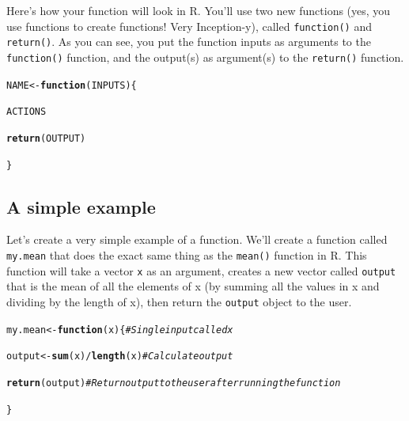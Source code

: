 \documentclass{tufte-book}\usepackage[]{graphicx}\usepackage[]{color}
\makeatletter
\newcommand{\hlcom}[1]{\textcolor[rgb]{0.678,0.584,0.686}{\textit{#1}}}%
\newcommand{\hlopt}[1]{\textcolor[rgb]{0,0,0}{#1}}%
\newcommand{\hlstd}[1]{\textcolor[rgb]{0.345,0.345,0.345}{#1}}%
\newcommand{\hlkwa}[1]{\textcolor[rgb]{0.161,0.373,0.58}{\textbf{#1}}}%
\newcommand{\hlkwb}[1]{\textcolor[rgb]{0.69,0.353,0.396}{#1}}%
\newcommand{\hlkwc}[1]{\textcolor[rgb]{0.333,0.667,0.333}{#1}}%
\newcommand{\hlkwd}[1]{\textcolor[rgb]{0.737,0.353,0.396}{\textbf{#1}}}%
\newenvironment{kframe}{%
 \def\at@end@of@kframe{}%
 \ifinner\ifhmode%
  \def\at@end@of@kframe{\end{minipage}}%
  \begin{minipage}{\columnwidth}%
 \fi\fi%
 \def\FrameCommand##1{\hskip\@totalleftmargin \hskip-\fboxsep
 \colorbox{shadecolor}{##1}\hskip-\fboxsep
     \hskip-\linewidth \hskip-\@totalleftmargin \hskip\columnwidth}%
 \MakeFramed {\advance\hsize-\width
   \@totalleftmargin\z@ \linewidth\hsize
   \@setminipage}}%
 {\par\unskip\endMakeFramed%
 \at@end@of@kframe}
\newenvironment{knitrout}{}{} %
\makeatother
\begin{document}
Here's how your function will look in R. You'll use two new functions (yes, you use functions to create functions! Very Inception-y), called \texttt{function()} and \texttt{return()}. As you can see, you put the function inputs as arguments to the \texttt{function()} function, and the output(s) as argument(s) to the \texttt{return()} function.

\begin{knitrout}
\color{fgcolor}\begin{kframe}
\begin{alltt}
\hlstd{NAME} \hlkwb{<-} \hlkwa{function}\hlstd{(}\hlkwc{INPUTS}\hlstd{) \{}

  \hlstd{ACTIONS}

  \hlkwd{return}\hlstd{(OUTPUT)}

  \hlstd{\}}
\end{alltt}
\end{kframe}
\end{knitrout}


\subsection{A simple example}

Let's create a very simple example of a function. We'll create a function called \texttt{my.mean} that does the exact same thing as the \texttt{mean()} function in R. This function will take a vector \texttt{x} as an argument, creates a new vector called \texttt{output} that is the mean of all the elements of x (by summing all the values in x and dividing by the length of x), then return the \texttt{output} object to the user.

\begin{knitrout}
\color{fgcolor}\begin{kframe}
\begin{alltt}
\hlstd{my.mean} \hlkwb{<-} \hlkwa{function}\hlstd{(}\hlkwc{x}\hlstd{) \{}   \hlcom{# Single input called x}

  \hlstd{output} \hlkwb{<-} \hlkwd{sum}\hlstd{(x)} \hlopt{/} \hlkwd{length}\hlstd{(x)} \hlcom{# Calculate output}

\hlkwd{return}\hlstd{(output)}  \hlcom{# Return output to the user after running the function}

\hlstd{\}}
\end{alltt}
\end{kframe}
\end{knitrout}
\end{document}

